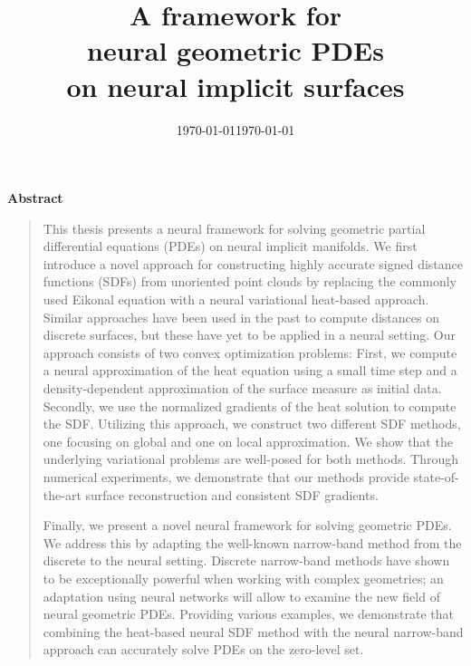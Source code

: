 \documentclass[12pt,openany]{book}
\date{\today}
\title{A framework for \\ neural geometric PDEs\\on neural implicit surfaces}
\date{\today}
\theoremstyle{plainnormal}
\newenvironment{abstract}{
  \cleardoublepage
  \null\vfill
  \begin{center}\bfseries Abstract\end{center}
  \begin{quote}
}{
  \end{quote}
  \vfill\null
  \cleardoublepage
}
\theoremstyle{remark}
\begin{document}
\pagestyle{empty}

\maketitle

\pagestyle{headings}
\setcounter{page}{5}

\begingroup
\let\clearpage\relax

\begin{abstract}
This thesis presents a neural framework for solving geometric partial differential equations (PDEs) on neural implicit manifolds. We first introduce a novel approach for constructing highly accurate signed distance functions (SDFs) from unoriented point clouds by replacing the commonly used Eikonal equation with a neural variational heat-based approach. Similar approaches have been used in the past to compute distances on discrete surfaces, but these have yet to be applied in a neural setting. Our approach consists of two convex optimization problems: First, we compute a neural approximation of the heat equation using a small time step and a density-dependent approximation of the surface measure as initial data. Secondly, we use the normalized gradients of the heat solution to compute the SDF. Utilizing this approach, we construct two different SDF methods, one focusing on global and one on local approximation. We show that the underlying variational problems are well-posed for both methods.
Through numerical experiments, we demonstrate that our methods provide state-of-the-art surface reconstruction and consistent SDF gradients.\par
Finally, we present a novel neural framework for solving geometric PDEs. We address this by adapting the well-known narrow-band method from the discrete to the neural setting. Discrete narrow-band methods have shown to be exceptionally powerful when working with complex geometries; an adaptation using neural networks will allow to examine the new field of neural geometric PDEs. Providing various examples, we demonstrate that combining the heat-based neural SDF method with the neural narrow-band approach can accurately solve PDEs on the zero-level set.
\end{abstract}
\end{document}
